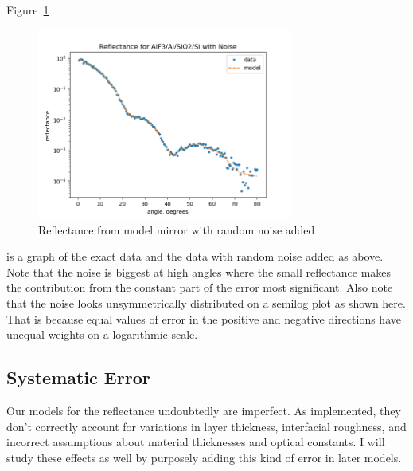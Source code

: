 \documentclass[english]{scrartcl}
\begin{document}
Figure~\ref{fig:noise}
\begin{figure}[htb]
  \begin{center}
    \includegraphics[width=0.75\textwidth]{images/noise}
  \end{center}
  \caption{\label{fig:noise}Reflectance from model mirror with random
  noise added}
\end{figure}
is a graph of the exact data and the data with
random noise added as above. Note that the noise is biggest at high
angles where the small reflectance makes the contribution from the
constant part of the error most significant. Also note that the noise
looks unsymmetrically distributed on a semilog plot as shown here.
That is because equal values of error in the positive and negative
directions have unequal weights on a logarithmic scale.

\subsection{Systematic Error}\label{sec-syserr}
Our models for the reflectance undoubtedly are imperfect. As implemented,
they don't correctly account for variations in layer thickness, interfacial
roughness, and incorrect assumptions about material thicknesses and
optical constants. I will study these effects as well by purposely adding
this kind of error in later models.
\end{document}
